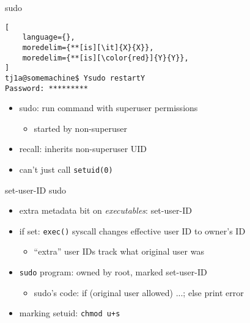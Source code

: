 \begin{frame}[fragile,label=sudoEx]{sudo}
\begin{lstlisting}[
    language={},
    moredelim={**[is][\it]{X}{X}},
    moredelim={**[is][\color{red}]{Y}{Y}},
]
tj1a@somemachine$ Ysudo restartY
Password: *********
\end{lstlisting}
\begin{itemize}
\item sudo: run command with superuser permissions
    \begin{itemize}
    \item started by non-superuser
    \end{itemize}
\item recall: inherits non-superuser UID
\item can't just call \texttt{setuid(0)}
\end{itemize}
\end{frame}

\begin{frame}{set-user-ID sudo}
\begin{itemize}
\item extra metadata bit on \textit{executables}: set-user-ID
\item if set: \texttt{exec()} syscall changes effective user ID to owner's ID
    \begin{itemize}
    \item ``extra'' user IDs track what original user was
    \end{itemize}
\item \texttt{sudo} program: owned by root, marked set-user-ID
    \begin{itemize}
    \item sudo's code: if (original user allowed) ...; else print error
    \end{itemize}
\vspace{.5cm}
\item marking setuid: \texttt{chmod u+s}
\end{itemize}
\end{frame}

